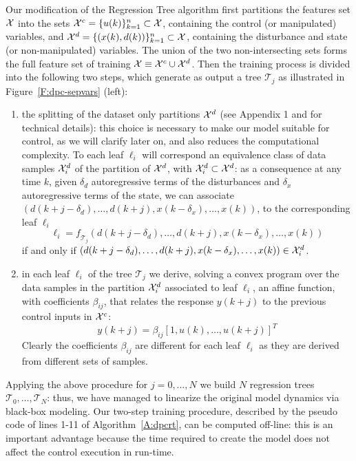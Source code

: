 \textcolor[rgb]{0,0,1}{Our modification of the Regression Tree algorithm first partitions the features set $\mathcal{X}$ into the sets $\mathcal{X}^c = \{u(k)\}_{k=1}^n\subset\mathcal{X}$, containing the control (or manipulated) variables, and $\mathcal{X}^d = \{(x(k),d(k))\}_{k=1}^n\subset\mathcal{X}$, containing the disturbance and state (or non-manipulated) variables. The  union of the two non-intersecting sets forms the full feature set of training $\mathcal{X} \equiv \mathcal{X}^c \cup \mathcal{X}^d$.
Then the training process is divided into the following two steps, which generate as output a tree $\mathcal{T}_j$ as illustrated in Figure~\ref{F:dpc-sepvars} (left):
\begin{enumerate}
	\item the splitting of the dataset only partitions $\mathcal{X}^d$ (see Appendix 1 and \cite{hastie2009elements} for technical details): this choice is necessary to make our model suitable for control, as we will clarify later on, and also reduces the computational complexity. To each leaf $\ell_i$ will correspond an equivalence class of data samples $\mathcal{X}^d_i$ of the partition of $\mathcal{X}^d$, with $\mathcal{X}^d_i\subset \mathcal{X}^d$: as a consequence at any time $k$, given $\delta_d$ autoregressive terms of the disturbances and $\delta_x$ autoregressive terms of the state, we can associate $( d(k+j-\delta_d),\ldots,d(k+j),x(k-\delta_x),\ldots,x(k) )$, to the corresponding leaf $\ell_i$
	\begin{equation}\label{E:model_tree}
		\ell_i = \mathit{f}_{\mathcal{T}_j} \left( d(k+j-\delta_d),\ldots,d(k+j),x(k-\delta_x),\ldots,x(k)  \right)
	\end{equation}
	if and only if $( d(k+j-\delta_d),\ldots,d(k+j),x(k-\delta_x),\ldots,x(k)) \in \mathcal{X}^d_i$.
	\item in each leaf $\ell_i$ of the tree $\mathcal{T}_j$ we derive, solving a convex program over the data samples in the partition $\mathcal{X}^d_i$ associated to leaf $\ell_i$, an affine function, with coefficients $\beta_{ij}$, that relates the response $y(k+j)$ to the previous control inputs in $\mathcal{X}^c$:
	\begin{equation}\label{E:model_leaf}
		y(k+j) =  \beta_{ij} [1,u(k),\ldots,u(k+j) ]^T
	\end{equation}
	Clearly the coefficients $\beta_{ij}$ are different for each leaf $\ell_i$ as they are derived from different sets of samples.
\end{enumerate}
Applying the above procedure for $j=0,\ldots,N$ we build $N$ regression trees $\mathcal{T}_0,\ldots,\mathcal{T}_N$: thus, we have managed to linearize the original model dynamics via black-box modeling. Our two-step training procedure, described by the pseudo code of lines 1-11 of Algorithm~\ref{A:dpcrt}, can be computed off-line: this is an important advantage because the time required to create the model does not affect the control execution in run-time.}
